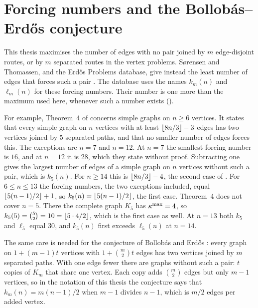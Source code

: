 \section{Forcing numbers and the Bollob\'{a}s--Erd\H{o}s conjecture}\label{sec:bollobas-erdos}

\begin{remark}\label{rem:threshold-convention}
This thesis maximises the number of edges with no pair joined by $m$ edge-disjoint routes, or by $m$ separated routes in the vertex problems.
S{\o}rensen and Thomassen, and the Erd\H{o}s Problems database, give instead the least number of edges that forces such a pair \cite{SorensenThomassen74,ErdosProblems}.
The database uses the names $k_m(n)$ and $\ell_m(n)$ for these forcing numbers.
Their number is one more than the maximum used here, whenever such a number exists ().

For example, Theorem~4 of \cite{SorensenThomassen74} concerns simple graphs on $n\ge6$ vertices.
It states that every simple graph on $n$ vertices with at least $\left\lfloor 8n/3 \right\rfloor-3$ edges has two vertices joined by $5$ separated paths, and that no smaller number of edges forces this.
The exceptions are $n=7$ and $n=12$. At $n=7$ the smallest forcing number is $16$, and at $n=12$ it is $28$, which they state without proof.
Subtracting one gives the largest number of edges of a simple graph on $n$ vertices without such a pair, which is $k_5(n)$.
For $n\ge14$ this is $\left\lfloor 8n/3 \right\rfloor-4$, the second case of .
For $6\le n\le13$ the forcing numbers, the two exceptions included, equal $\left\lfloor 5(n-1)/2 \right\rfloor+1$, so $k_5(n)=\left\lfloor 5(n-1)/2 \right\rfloor$, the first case.
Theorem~4 does not cover $n=5$.
There the complete graph $K_5$ has $\kappa^{\max}=4$, so $k_5(5)=\binom52=10=\left\lfloor 5\cdot4/2 \right\rfloor$, which is the first case as well.
At $n=13$ both $k_5$ and $\ell_5$ equal $30$, and $k_5(n)$ first exceeds $\ell_5(n)$ at $n=14$.

The same care is needed for the conjecture of Bollob\'{a}s and Erd\H{o}s \cite{BollobasErdos62,ErdosProblems}: every graph on $1+(m-1)t$ vertices with $1+\binom m2 t$ edges has two vertices joined by $m$ separated paths.
With one edge fewer there are graphs without such a pair: $t$ copies of $K_m$ that share one vertex.
Each copy adds $\binom m2$ edges but only $m-1$ vertices, so in the notation of this thesis the conjecture says that $k_m(n)=m(n-1)/2$ when $m-1$ divides $n-1$, which is $m/2$ edges per added vertex.
\end{remark}

